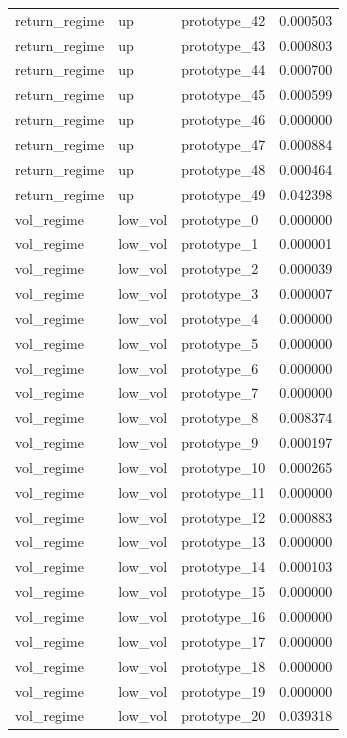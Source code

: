 \begin{tabular}{lllr}
return\_regime & up & prototype\_42 & 0.000503 \\
return\_regime & up & prototype\_43 & 0.000803 \\
return\_regime & up & prototype\_44 & 0.000700 \\
return\_regime & up & prototype\_45 & 0.000599 \\
return\_regime & up & prototype\_46 & 0.000000 \\
return\_regime & up & prototype\_47 & 0.000884 \\
return\_regime & up & prototype\_48 & 0.000464 \\
return\_regime & up & prototype\_49 & 0.042398 \\
vol\_regime & low\_vol & prototype\_0 & 0.000000 \\
vol\_regime & low\_vol & prototype\_1 & 0.000001 \\
vol\_regime & low\_vol & prototype\_2 & 0.000039 \\
vol\_regime & low\_vol & prototype\_3 & 0.000007 \\
vol\_regime & low\_vol & prototype\_4 & 0.000000 \\
vol\_regime & low\_vol & prototype\_5 & 0.000000 \\
vol\_regime & low\_vol & prototype\_6 & 0.000000 \\
vol\_regime & low\_vol & prototype\_7 & 0.000000 \\
vol\_regime & low\_vol & prototype\_8 & 0.008374 \\
vol\_regime & low\_vol & prototype\_9 & 0.000197 \\
vol\_regime & low\_vol & prototype\_10 & 0.000265 \\
vol\_regime & low\_vol & prototype\_11 & 0.000000 \\
vol\_regime & low\_vol & prototype\_12 & 0.000883 \\
vol\_regime & low\_vol & prototype\_13 & 0.000000 \\
vol\_regime & low\_vol & prototype\_14 & 0.000103 \\
vol\_regime & low\_vol & prototype\_15 & 0.000000 \\
vol\_regime & low\_vol & prototype\_16 & 0.000000 \\
vol\_regime & low\_vol & prototype\_17 & 0.000000 \\
vol\_regime & low\_vol & prototype\_18 & 0.000000 \\
vol\_regime & low\_vol & prototype\_19 & 0.000000 \\
vol\_regime & low\_vol & prototype\_20 & 0.039318 \\

\end{tabular}
